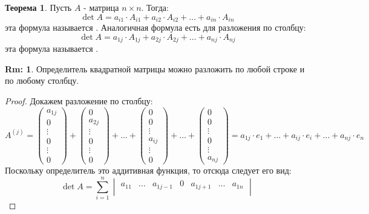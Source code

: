 \documentclass[12pt]{article}
\theoremstyle{definition}
\newtheorem{rem}{Rm:}
\newtheorem{theorem}{Теорема}
\newcommand{\ddsum}[2]{\displaystyle\sum\limits_{#1}^{#2}}
\begin{document}
\begin{theorem}
	Пусть $A$ - матрица $n\times n$. Тогда:
	$$
		\det{A} = a_{i1}{\cdot}A_{i1} + a_{i2}{\cdot}A_{i2} + \dotsc + a_{in}{\cdot}A_{in}
	$$
	эта формула называется . Аналогичная формула есть для разложения по столбцу:
	$$
		\det{A} = a_{1j}{\cdot}A_{1j} + a_{2j}{\cdot}A_{2j} + \dotsc + a_{nj}{\cdot}A_{nj}
	$$
	эта формула называется .
\end{theorem}
\begin{rem}
	Определитель квадратной матрицы можно разложить по любой строке и по любому столбцу.
\end{rem}
\begin{proof}
	Докажем разложение по столбцу:
	$$
		A^{(j)} = 
		\begin{pmatrix}
			a_{1j}\\
			0\\
			\vdots \\
			0\\
			\vdots \\
			0
		\end{pmatrix} + 
		\begin{pmatrix}
			0\\
			a_{2j}\\
			\vdots \\
			0\\
			\vdots \\
			0
		\end{pmatrix} + \dotsc +
		\begin{pmatrix}
			0\\
			0 \\
			\vdots \\
			a_{ij}\\
			\vdots \\
			0
		\end{pmatrix} + \dotsc +
		\begin{pmatrix}
			0\\
			0 \\
			\vdots \\
			0\\
			\vdots \\
			a_{nj}
		\end{pmatrix} = a_{1j}{\cdot}e_1 + \dotsc + a_{ij}{\cdot}e_i + \dotsc + a_{nj}{\cdot}e_n	
	$$
	Поскольку определитель это аддитивная функция, то отсюда следует его вид:
	$$
		\det{A} = \ddsum{i = 1}{n} 
		\begin{vmatrix}
			a_{11} & \dotsc & a_{1j-1} & 0 & a_{1j+1} & \dotsc & a_{1n}\\

\end{vmatrix}$$
\end{proof}
\end{document}
